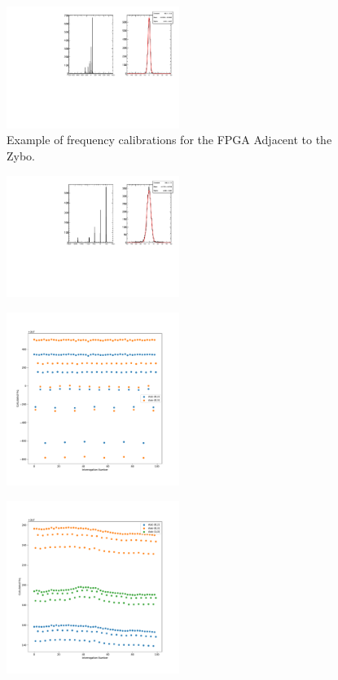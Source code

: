 \begin{figure}[]
\centering
\includegraphics[width=0.5\textwidth]{images/(0,0).pdf}
\caption{Example of frequency calibrations for the FPGA Adjacent to the Zybo.}
\end{figure}

\begin{figure}[]
\centering
\includegraphics[width=0.5\textwidth]{images/(3,3).pdf}
\caption{}
\end{figure}

\begin{figure}[]
\centering
\includegraphics[width=0.5\textwidth]{images/fast_example.pdf}
\caption{}
\end{figure}

\begin{figure}[]
\centering
\includegraphics[width=0.5\textwidth]{images/slow_example.pdf}
\caption{}
\end{figure}


